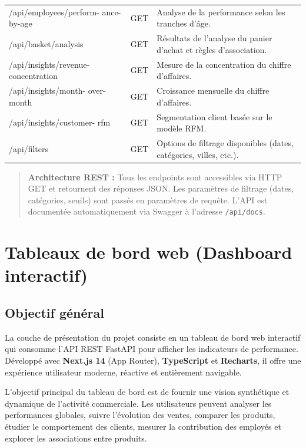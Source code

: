 \documentclass[12pt,a4paper,twoside]{report}
\begin{document}
\begin{longtable}{>{\ttfamily}p{5cm}cp{7cm}}
/api/employees/perform-
ance-by-age & GET &
Analyse de la performance selon les tranches d'âge. \\

/api/basket/analysis & GET &
Résultats de l'analyse du panier d'achat et règles d'association. \\

/api/insights/revenue-
concentration & GET &
Mesure de la concentration du chiffre d'affaires. \\

/api/insights/month-
over-month & GET &
Croissance mensuelle du chiffre d'affaires. \\

/api/insights/customer-
rfm & GET &
Segmentation client basée sur le modèle RFM. \\

/api/filters & GET &
Options de filtrage disponibles (dates, catégories, villes, etc.). \\

\end{longtable}

\begin{quotation}
\noindent\textbf{Architecture REST :}\newline
Tous les endpoints sont accessibles via HTTP GET et retournent des réponses JSON. Les paramètres de filtrage (dates, catégories, seuils) sont passés en paramètres de requête. L'API est documentée automatiquement via Swagger à l'adresse \texttt{/api/docs}.
\end{quotation}

\chapter{Tableaux de bord web (Dashboard interactif)}

\section{Objectif général}

La couche de présentation du projet consiste en un tableau de bord web interactif qui consomme l'API REST FastAPI pour afficher les indicateurs de performance. Développé avec \textbf{Next.js 14} (App Router), \textbf{TypeScript} et \textbf{Recharts}, il offre une expérience utilisateur moderne, réactive et entièrement navigable.

L'objectif principal du tableau de bord est de fournir une vision synthétique et dynamique de l'activité commerciale. Les utilisateurs peuvent analyser les performances globales, suivre l'évolution des ventes, comparer les produits, étudier le comportement des clients, mesurer la contribution des employés et explorer les associations entre produits.
\end{document}
